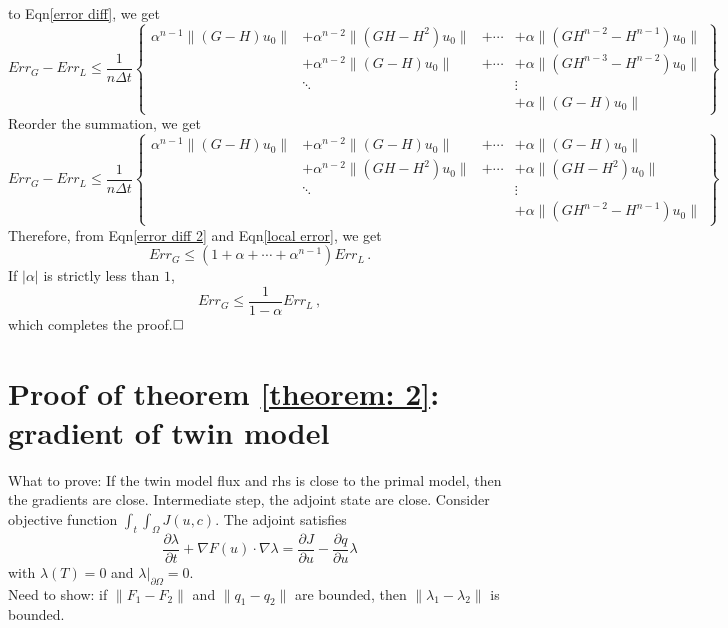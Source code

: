 \documentclass[a4paper,onecolumn]{article}
\theoremstyle{remark}
\begin{document}
\begin{appendices}
    to Eqn\eqref{error diff}, we get
    \begin{equation}
        Err_G - Err_L \le 
        \frac{1}{n\Delta t}
        \left\{\begin{split}
            \alpha^{n-1}\|(G - H)u_0\| &+ \alpha^{n-2}\|(GH - H^2)u_0\|&+\cdots
            &+ \alpha\|(GH^{n-2} - H^{n-1})u_0\|\\
            &+\alpha^{n-2}\|( G - H)u_0\| &+ \cdots 
            &+ \alpha\|(GH^{n-3} - H^{n-2})u_0\|\\
            &\ddots&& \vdots\\
            &&& + \alpha\|(G - H)u_0\|
        \end{split}
        \right\}
        \label{error diff}
    \end{equation}
    Reorder the summation, we get
    \begin{equation}
        Err_G - Err_L \le 
        \frac{1}{n\Delta t}
        \left\{\begin{split}
            \alpha^{n-1}\|(G - H)u_0\| &+ \alpha^{n-2}\|(G - H)u_0\|&+\cdots
            &+ \alpha\|(G - H)u_0\|\\
            &+\alpha^{n-2}\|( GH - H^2)u_0\| &+ \cdots 
            &+ \alpha\|(GH - H^{2})u_0\|\\
            &\ddots&& \vdots\\
            &&& + \alpha\|(GH^{n-2} - H^{n-1})u_0\|
        \end{split}
        \right\}
        \label{error diff 2}
    \end{equation}
    Therefore, from Eqn\eqref{error diff 2} and Eqn\eqref{local error}, we get
    \begin{equation}
        Err_G \le (1+\alpha+\cdots+\alpha^{n-1}) Err_L\,.
    \end{equation}
    If $|\alpha|$ is strictly less than $1$, 
    \begin{equation}
        Err_G \le \frac{1}{1-\alpha} Err_L\,,
    \end{equation}
    which completes the proof.$\hfill\Box$

    \section{Proof of theorem \ref{theorem: 2}: gradient of twin model}
    What to prove: If the twin model flux and rhs is close to the primal model,
    then the gradients are close. Intermediate step, the adjoint state are close.
    Consider objective function $\int_t\int_{\Omega} J(u,c)$.
    The adjoint satisfies
    \begin{equation}
        \frac{\partial \lambda}{\partial t} + \nabla F(u)\cdot \nabla\lambda
        = \frac{\partial J}{\partial u} - \frac{\partial q}{\partial u}\lambda
    \end{equation}
    with $\lambda(T) = 0$ and $\lambda\big|_{\partial \Omega} = 0$.\\
    Need to show: if $\|F_1-F_2\|$ and $\|q_1-q_2\|$ are bounded, then
    $\|\lambda_1-\lambda_2\|$ is bounded.

\end{appendices}
\end{document}
